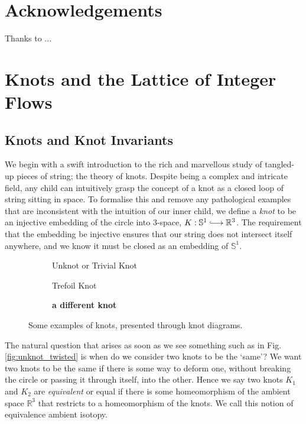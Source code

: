 \documentclass[12pt]{report}
\newcommand{\R}{\mathbb{R}}
\renewcommand{\S}{\mathbb{S}}
\newcommand{\notered}[1]{{\color{Red} \textbf{#1}}}
\begin{document}
\chapter*{Acknowledgements}

Thanks to ...


\chapter{Knots and the Lattice of Integer Flows}

\section{Knots and Knot Invariants}

We begin with a swift introduction to the rich and marvellous study of tangled-up pieces of string; the theory of knots. Despite being a complex and intricate field, any child can intuitively grasp the concept of a knot as a closed loop of string sitting in space. To formalise this and remove any pathological examples that are inconsistent with the intuition of our inner child, we define a \textit{knot} to be an injective embedding of the circle into $3$-space, $K: \S^{1} \lhook\joinrel\longrightarrow \R^{3}$. The requirement that the embedding be injective ensures that our string does not intersect itself anywhere, and we know it must be closed as an embedding of $\S^{1}$.

\begin{figure}[hbt]
	\centering
	\hfill
	\begin{subfigure}[b]{0.3 \textwidth}
		\centering
		\def\svgscale{0.2}
		
		\caption{Unknot or Trivial Knot}
	\end{subfigure}
	\hfill
	\begin{subfigure}[b]{0.3 \textwidth}
		\centering
		\def\svgscale{0.2}
		
		\caption{Trefoil Knot}
	\end{subfigure}
	\hfill
	\begin{subfigure}[b]{0.3 \textwidth}
		\centering
		\def\svgscale{0.2}
		
		\caption{\notered{a different knot}}
	\end{subfigure}
	\caption{Some examples of knots, presented through knot diagrams.}
	\label{fig:knot-examples}
	\hfill \phantom{1}
\end{figure}

The natural question that arises as soon as we see something such as in Fig. \ref{fig:unknot_twisted} is when do we consider two knots to be the `same'? We want two knots to be the same if there is some way to deform one, without breaking the circle or passing it through itself, into the other. Hence we say two knots $K_{1}$ and $K_{2}$ are \textit{equivalent} or equal if there is some homeomorphism of the ambient space $\R^{3}$ that restricts to a homeomorphism of the knots. We call this notion of equivalence ambient isotopy.
\end{document}
